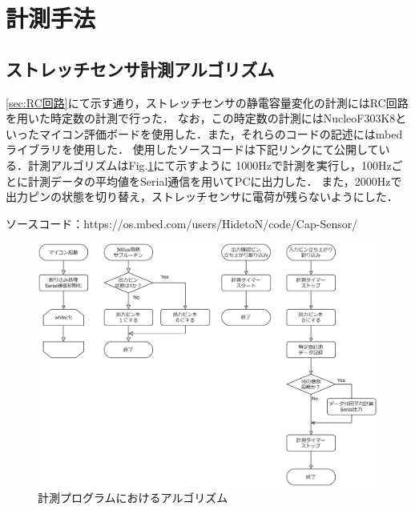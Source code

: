 \section{計測手法}
\subsection{ストレッチセンサ計測アルゴリズム}
\ref{sec:RC回路}にて示す通り，ストレッチセンサの静電容量変化の計測にはRC回路を用いた時定数の計測で行った．
なお，この時定数の計測にはNucleoF303K8といったマイコン評価ボードを使用した．また，それらのコードの記述にはmbedライブラリを使用した．
使用したソースコードは下記リンクにて公開している．計測アルゴリズムはFig.\ref{fig:algorithm}にて示すように
1000Hzで計測を実行し，100Hzごとに計測データの平均値をSerial通信を用いてPCに出力した．
また，2000Hzで出力ピンの状態を切り替え，ストレッチセンサに電荷が残らないようにした．

ソースコード：https://os.mbed.com/users/HidetoN/code/Cap-Sensor/

\begin{figure}[h]
    \begin{center}
     \includegraphics[width=0.9\columnwidth,clip]{./3_analysis/algorithm.eps}
     \caption{計測プログラムにおけるアルゴリズム}
     \label{fig:algorithm}
    \end{center}
\end{figure}

